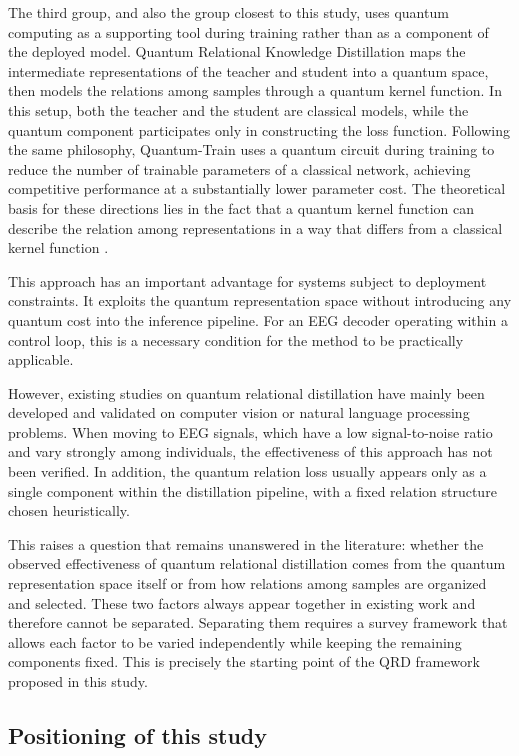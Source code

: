 The third group, and also the group closest to this study, uses
quantum computing as a supporting tool during training rather than
as a component of the deployed model. Quantum Relational Knowledge
Distillation \cite{liu2025quantum} maps the intermediate
representations of the teacher and student into a quantum space,
then models the relations among samples through a quantum kernel
function. In this setup, both the teacher and the student are
classical models, while the quantum component participates only in
constructing the loss function. Following the same philosophy,
Quantum-Train \cite{liu2025quantumtrain} uses a quantum circuit
during training to reduce the number of trainable parameters of a
classical network, achieving competitive performance at a
substantially lower parameter cost. The theoretical basis for these
directions lies in the fact that a quantum kernel function can
describe the relation among representations in a way that differs
from a classical kernel function \cite{liu2022representation}.

This approach has an important advantage for systems subject to
deployment constraints. It exploits the quantum representation space
without introducing any quantum cost into the inference pipeline.
For an EEG decoder operating within a control loop, this is a
necessary condition for the method to be practically applicable.

However, existing studies on quantum relational distillation have
mainly been developed and validated on computer vision or natural
language processing problems. When moving to EEG signals, which have
a low signal-to-noise ratio and vary strongly among individuals, the
effectiveness of this approach has not been verified. In addition,
the quantum relation loss usually appears only as a single component
within the distillation pipeline, with a fixed relation structure
chosen heuristically.

This raises a question that remains unanswered in the literature:
whether the observed effectiveness of quantum relational distillation
comes from the quantum representation space itself or from how
relations among samples are organized and selected. These two
factors always appear together in existing work and therefore cannot
be separated. Separating them requires a survey framework that
allows each factor to be varied independently while keeping the
remaining components fixed. This is precisely the starting point of
the QRD framework proposed in this study.

\subsection{Positioning of this study}
\label{sec:dinhvi}

